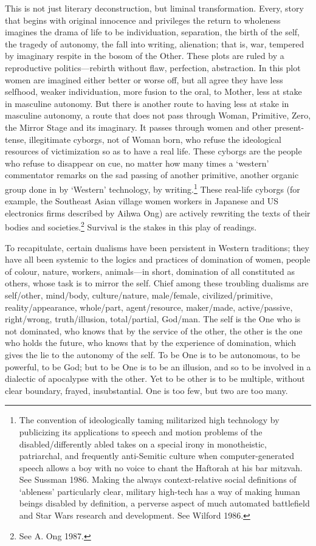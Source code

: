 \documentclass[DIV=12,%
               BCOR=10mm,%
               headinclude=false,%
               footinclude=false,open=any,%
               fontsize=11pt,%
               twoside,%
               paper=210mm:11in]%
               {scrbook}
\newcommand*{\Slash}{\slash\hspace{0pt}}
\begin{document}
This is not just literary deconstruction, but liminal transformation. Every, story that begins with original innocence and privileges the return to wholeness imagines the drama of life to be individuation, separation, the birth of the self, the tragedy of autonomy, the fall into writing, alienation; that is, war, tempered by imaginary respite in the bosom of the Other. These plots are ruled by a reproductive politics—rebirth without flaw, perfection, abstraction. In this plot women are imagined either better or worse off, but all agree they have less selfhood, weaker individuation, more fusion to the oral, to Mother, less at stake in masculine autonomy. But there is another route to having less at stake in masculine autonomy, a route that does not pass through Woman, Primitive, Zero, the Mirror Stage and its imaginary. It passes through women and other present-tense, illegitimate cyborgs, not of Woman born, who refuse the ideological resources of victimization so as to have a real life. These cyborgs are the people who refuse to disappear on cue, no matter how many times a ‘western’ commentator remarks on the sad passing of another primitive, another organic group done in by ‘Western’ technology, by writing.\footnote{The convention of ideologically taming militarized high technology by publicizing its applications to speech and motion problems of the disabled\Slash{}differently abled takes on a special irony in monotheistic, patriarchal, and frequently anti-Semitic culture when computer-generated speech allows a boy with no voice to chant the Haftorah at his bar mitzvah. See Sussman 1986. Making the always context-relative social definitions of ‘ableness’ particularly clear, military high-tech has a way of making human beings disabled by definition, a perverse aspect of much automated battlefield and Star Wars research and development. See Wilford 1986.} These real-life cyborgs (for example, the Southeast Asian village women workers in Japanese and US electronics firms described by Aihwa Ong) are actively rewriting the texts of their bodies and societies.\footnote{See A. Ong 1987.} Survival is the stakes in this play of readings.


To recapitulate, certain dualisms have been persistent in Western traditions; they have all been systemic to the logics and practices of domination of women, people of colour, nature, workers, animals—in short, domination of all constituted as others, whose task is to mirror the self. Chief among these troubling dualisms are self\Slash{}other, mind\Slash{}body, culture\Slash{}nature, male\Slash{}female, civilized\Slash{}primitive, reality\Slash{}appearance, whole\Slash{}part, agent\Slash{}resource, maker\Slash{}made, active\Slash{}passive, right\Slash{}wrong, truth\Slash{}illusion, total\Slash{}partial, God\Slash{}man. The self is the One who is not dominated, who knows that by the service of the other, the other is the one who holds the future, who knows that by the experience of domination, which gives the lie to the autonomy of the self. To be One is to be autonomous, to be powerful, to be God; but to be One is to be an illusion, and so to be involved in a dialectic of apocalypse with the other. Yet to be other is to be multiple, without clear boundary, frayed, insubstantial. One is too few, but two are too many.
\end{document}
